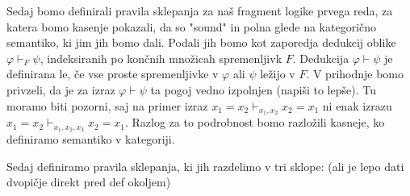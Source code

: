 \documentclass[12pt,a4paper]{book}
\theoremstyle{definition}
\theoremstyle{plain}
\theoremstyle{definition}
\theoremstyle{remark}
\begin{document}
Sedaj bomo definirali pravila sklepanja za naš fragment logike prvega reda, za katera bomo kasenje pokazali, da so "sound" in polna glede na kategorično semantiko, ki jim jih bomo dali.
Podali jih bomo kot zaporedja dedukcij oblike $\varphi \vdash_F \psi$, indeksiranih po končnih množicah spremenljivk $F$. Dedukcija $\varphi \vdash \psi$ je definirana le, če vse proste spremenljivke v $\varphi$ ali $\psi$ ležijo v $F$. V prihodnje bomo privzeli, da je za izraz $\varphi \vdash \psi$ ta pogoj vedno izpolnjen (napiši to lepše).
Tu moramo biti pozorni, saj na primer izraz $x_1 = x_2 \vdash_{x_1, x_2} x_2 = x_1$ ni enak izrazu $x_1 = x_2 \vdash_{x_1, x_2, x_3} x_2 = x_1$. Razlog za to podrobnost bomo razložili kasneje, ko definiramo semantiko v kategoriji.

Sedaj definiramo pravila sklepanja, ki jih razdelimo v tri sklope: (ali je lepo dati dvopičje direkt pred def okoljem)
\end{document}
